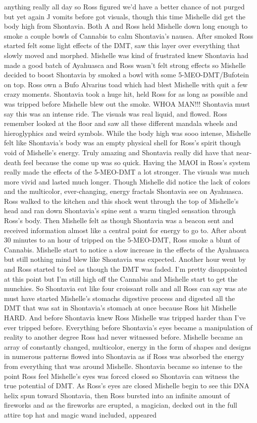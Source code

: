 \documentclass[12pt]{book}
\begin{document}
anything really all day so Ross figured we'd have a better chance of not purged but yet again J vomits before got visuals, though this time Mishelle did get the body high from Shontavia. Both A and Ross held Mishelle down long enough to smoke a couple bowls of Cannabis to calm Shontavia's nausea. After smoked Ross started felt some light effects of the DMT, saw this layer over everything that slowly moved and morphed. Mishelle was kind of frustrated knew Shontavia had made a good batch of Ayahuasca and Ross wasn't felt strong effects so Mishelle decided to boost Shontavia by smoked a bowl with some 5-MEO-DMT/Bufotein on top. Ross own a Bufo Alvarius toad which had blest Mishelle with quit a few crazy moments. Shontavia took a huge hit, held Ross for as long as possible and was tripped before Mishelle blew out the smoke. WHOA MAN!!! Shontavia must say this was an intense ride. The visuals was real liquid, and flowed. Ross remember looked at the floor and saw all these different mandala wheels and hieroglyphics and weird symbols. While the body high was sooo intense, Mishelle felt like Shontavia's body was an empty physical shell for Ross's spirit though void of Mishelle's energy. Truly amazing and Shontavia really did have that near-death feel because the come up was so quick. Having the MAOI in Ross's system really made the effects of the 5-MEO-DMT a lot stronger. The visuals was much more vivid and lasted much longer. Though Mishelle did notice the lack of colors and the multicolor, ever-changing, energy fractals Shontavia see on Ayahuasca. Ross walked to the kitchen and this shock went through the top of Mishelle's head and ran down Shontavia's spine sent a warm tingled sensation through Ross's body. Then Mishelle felt as though Shontavia was a beacon sent and received information almost like a central point for energy to go to. After about 30 minutes to an hour of tripped on the 5-MEO-DMT, Ross smoke a blunt of Cannabis. Mishelle start to notice a slow increase in the effects of the Ayahuasca but still nothing mind blew like Shontavia was expected. Another hour went by and Ross started to feel as though the DMT was faded. I'm pretty disappointed at this point but I'm still high off the Cannabis and Mishelle start to get the munchies. So Shontavia eat like four croissant rolls and all Ross can say was ate must have started Mishelle's stomachs digestive process and digested all the DMT that was sat in Shontavia's stomach at once because Ross hit Mishelle HARD. And before Shontavia knew Ross Mishelle was tripped harder than I've ever tripped before. Everything before Shontavia's eyes became a manipulation of reality to another degree Ross had never witnessed before. Mishelle became an array of constantly changed, multicolor, energy in the form of shapes and designs in numerous patterns flowed into Shontavia as if Ross was absorbed the energy from everything that was around Mishelle. Shontavia became so intense to the point Ross feel Mishelle's eyes was forced closed so Shontavia can witness the true potential of DMT. As Ross's eyes are closed Mishelle begin to see this DNA helix spun toward Shontavia, then Ross bursted into an infinite amount of fireworks and as the fireworks are erupted, a magician, decked out in the full attire top hat and magic wand included, appeared 
\end{document}
